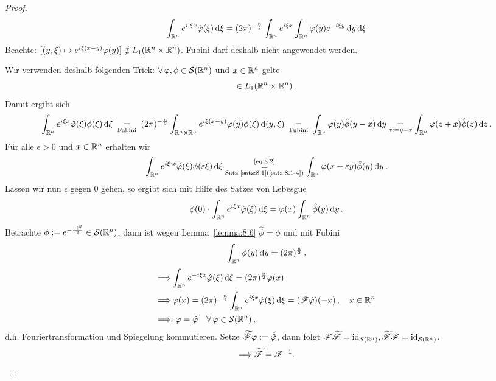 \begin{proof}
  \begin{dmath*}
    \int_{\R^n}e^{i\cdot\xi x}\hat\varphi(\xi)\d\xi
    =(2\pi)^{-\frac n2}\int_{\R^n}e^{i\xi x}\int_{\R^n}\varphi(y)e^{-i\xi y}\d y\d\xi
  \end{dmath*}
  Beachte: $[(y,\xi)\mapsto e^{i\xi(x-y)}\varphi(y)]\notin L_1(\mathbb{R}^n\times\mathbb{R}^n)$. Fubini darf deshalb nicht angewendet werden.

  Wir verwenden deshalb folgenden Trick: $\forall \,\varphi,\phi\in \mathcal S(\mathbb{R}^n)$ und $x\in\mathbb{R}^n$ gelte
  \begin{dmath*}
    [(y,\xi)\mapsto e^{i\cdot\xi(x-y)}\varphi(y)\phi(\xi)]\in L_1(\R^n\times\R^n)\, .
  \end{dmath*}
  Damit ergibt sich
  \begin{dmath}
    \label{eq:8.2}
    \int_{\R^n}e^{i\xi x}\hat\varphi(\xi)\phi(\xi)\d\xi
    \underset{\scriptsize\text{ Fubini }}=(2\pi)^{-\frac n2}\int_{\R^n\times\R^n}e^{i\xi(x-y)}\varphi(y)\phi(\xi)\d(y,\xi)
    \underset{\scriptsize\text{ Fubini }}=\int_{\R^n}\varphi(y)\hat\phi(y-x)\d y
    \underset{z:=y-x}=\int_{\R^n}\varphi(z+x)\hat\phi(z)\d z\, .
  \end{dmath}
  Für alle $\epsilon>0$ und $x\in\mathbb{R}^n$ erhalten wir
  \begin{dmath*}
    \int_{\R^n}e^{i\xi\cdot x}\hat\varphi(\xi)\phi(\epsilon\xi)\d\xi
    \underset{\scriptsize\text{Satz~\ref{satz:8.1}(\ref{satz:8.1-4})}}{\overset{\scriptsize\eqref{eq:8.2}}=}
    \int_{\R^n}\varphi(x+\epsilon y)\hat\phi(y)\d y\, .
  \end{dmath*}
  Lassen wir nun $\epsilon$ gegen $0$ gehen, so ergibt sich mit Hilfe des Satzes von Lebesgue
  \begin{dmath*}
    \phi(0)\cdot\int_{\R^n}e^{i\xi x}\hat\varphi(\xi)\d \xi=\varphi(x)\int_{\R^n}\hat\phi(y)\d y\, .
  \end{dmath*}
 Betrachte $\phi := e^{-\frac{\lvert \cdot\rvert^2}2} \in \mathcal S(\mathbb{R}^n)$, dann ist wegen Lemma~\ref{lemma:8.6} $\hat\phi = \phi$ und mit Fubini
 \[
 	\int_{\mathbb{R}^n} \phi(y) \,\mathrm{d} y = (2\pi)^{\frac n 2} \, .
 \]
 \begin{align*}
 	\Longrightarrow &\int_{\mathbb{R}^n} e^{-i\xi x} \hat\varphi (\xi) \,\mathrm{d}\xi  = (2\pi)^{\frac n2} \varphi(x) \\
	\Longrightarrow&\, \varphi(x)  = (2\pi)^{-\frac n2} \int_{\mathbb{R}^n} e^{i \xi x} \hat\varphi(\xi) \,\mathrm{d} \xi = (\mathscr{F} \hat\varphi)(-x) \, , \quad x \in \mathbb{R}^n \\
	\Longrightarrow &\!\!: \varphi  = \breve{\hat\varphi} \quad \forall \, \varphi \in \mathcal S(\mathbb{R}^n) \, ,
 \end{align*}
 d.h. Fouriertransformation und Spiegelung kommutieren. Setze $\widetilde{\mathscr{F}} \varphi:= \breve{\hat\varphi}$, dann folgt ${\mathscr{F}} \widetilde{\mathscr{F}} = \text{id}_{\mathcal S(\mathbb{R}^n)},\widetilde{\mathscr{F}} \mathscr{F} = \text{id}_{\mathcal S(\mathbb{R}^n)}$. 
 \[
 	\Longrightarrow \widetilde{\mathscr{F}} = \mathscr{F}^{-1}. \qedhere
\]
\end{proof}


